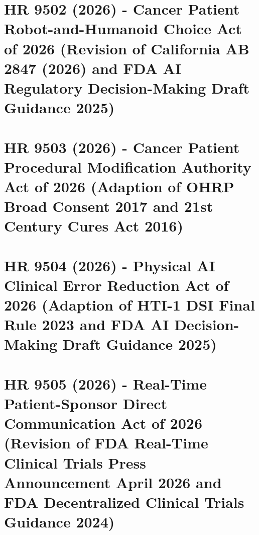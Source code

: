 \documentclass[11pt,letterpaper]{article}
\begin{document}
\section{HR 9502 (2026) - Cancer Patient Robot-and-Humanoid Choice Act of 2026 (Revision of California AB 2847 (2026) and FDA AI Regulatory Decision-Making Draft Guidance 2025)}
\label{sec:hr9502}

\newpage

\section{HR 9503 (2026) - Cancer Patient Procedural Modification Authority Act of 2026 (Adaption of OHRP Broad Consent 2017 and 21st Century Cures Act 2016)}
\label{sec:hr9503}

\newpage

\section{HR 9504 (2026) - Physical AI Clinical Error Reduction Act of 2026 (Adaption of HTI-1 DSI Final Rule 2023 and FDA AI Decision-Making Draft Guidance 2025)}
\label{sec:hr9504}

\newpage

\section{HR 9505 (2026) - Real-Time Patient-Sponsor Direct Communication Act of 2026 (Revision of FDA Real-Time Clinical Trials Press Announcement April 2026 and FDA Decentralized Clinical Trials Guidance 2024)}
\label{sec:hr9505}

\newpage
\end{document}
